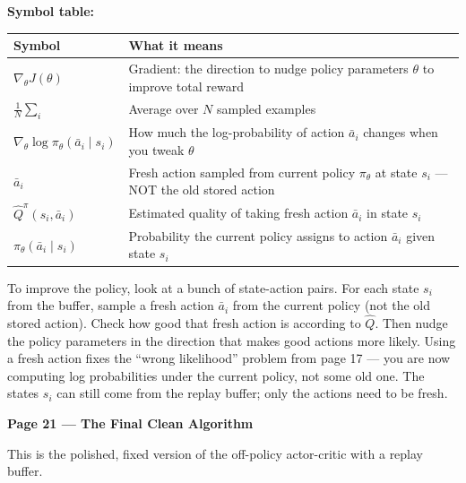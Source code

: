 \medskip
\textbf{Symbol table:}

\begin{tabular}{p{5.5cm} p{8.5cm}}
\hline
\textbf{Symbol} & \textbf{What it means} \\
\hline
$\nabla_\theta J(\theta)$ & Gradient: the direction to nudge policy parameters $\theta$ to improve total reward \\[4pt]
$\frac{1}{N} \sum_i$ & Average over $N$ sampled examples \\[4pt]
$\nabla_\theta \log \pi_\theta(\bar{a}_i \mid s_i)$ & How much the log-probability of action $\bar{a}_i$ changes when you tweak $\theta$ \\[4pt]
$\bar{a}_i$ & Fresh action sampled from current policy $\pi_\theta$ at state $s_i$ --- NOT the old stored action \\[4pt]
$\hat{Q}^{\pi}(s_i, \bar{a}_i)$ & Estimated quality of taking fresh action $\bar{a}_i$ in state $s_i$ \\[4pt]
$\pi_\theta(\bar{a}_i \mid s_i)$ & Probability the current policy assigns to action $\bar{a}_i$ given state $s_i$ \\
\hline
\end{tabular}

\medskip
To improve the policy, look at a bunch of state-action pairs. For each state $s_i$
from the buffer, sample a fresh action $\bar{a}_i$ from the current policy (not the
old stored action). Check how good that fresh action is according to $\hat{Q}$.
Then nudge the policy parameters in the direction that makes good actions more likely.
Using a fresh action fixes the ``wrong likelihood'' problem from page 17 --- you are
now computing log probabilities under the current policy, not some old one.
The states $s_i$ can still come from the replay buffer; only the actions need to be fresh.

\bigskip

\textbf{Page 21 --- The Final Clean Algorithm}

\medskip
This is the polished, fixed version of the off-policy actor-critic with a replay buffer.


